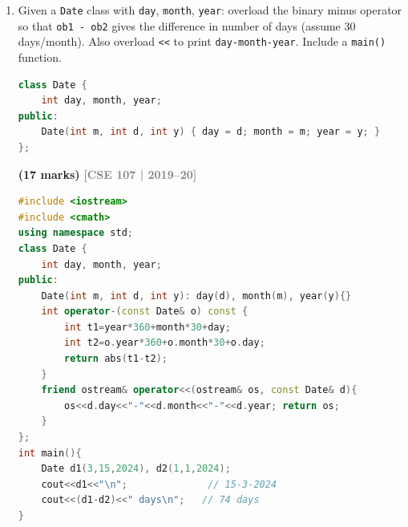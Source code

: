 \documentclass[12pt,a3paper]{article}
\newcommand{\yr}[1]{\hfill\textcolor{gray}{\small\textbf{[#1]}}}
\newcommand{\mk}[1]{\textcolor{orange!70!black}{\small\textbf{(#1 marks)}}}
\begin{document}
\begin{enumerate}
\begin{tcolorbox}
\begin{lstlisting}[language=C++]
#include <iostream>
using namespace std;

class Rational {
    int n, d;
public:
    Rational(int a=0, int b=1): n(a), d(b){}

    friend Rational operator+(const Rational& a, const Rational& b){
        return Rational(a.n*b.d + b.n*a.d, a.d*b.d);
    }
    friend Rational operator*(const Rational& a, const Rational& b){
        return Rational(a.n*b.n, a.d*b.d);
    }
    friend ostream& operator<<(ostream& os, const Rational& r){
        os<<r.n<<"/"<<r.d; return os;
    }
};

int main() {
    Rational r(1,2), s(1,3);
    cout << r+s << "\n";  // 5/6
    cout << r*s << "\n";  // 1/6
}
\end{lstlisting}

\end{tcolorbox}

\item Given a \texttt{Date} class with \texttt{day}, \texttt{month}, \texttt{year}: overload the binary minus operator so that \texttt{ob1 - ob2} gives the difference in number of days (assume 30 days/month). Also overload \texttt{<<} to print \texttt{day-month-year}. Include a \texttt{main()} function.
\begin{lstlisting}[language=C++]
class Date {
    int day, month, year;
public:
    Date(int m, int d, int y) { day = d; month = m; year = y; }
};
\end{lstlisting}
\mk{17}
\yr{CSE 107 | 2019--20}


\begin{tcolorbox}[enhanced,breakable,ansbox,colback=cF!4,colframe=cF,
  boxrule=0.8pt,arc=5pt,
  title={\textbf{Answer --- Date class --- binary - and << operators}},
  fonttitle=\bfseries\color{white},colbacktitle=cF]

\begin{lstlisting}[language=C++]
#include <iostream>
#include <cmath>
using namespace std;
class Date {
    int day, month, year;
public:
    Date(int m, int d, int y): day(d), month(m), year(y){}
    int operator-(const Date& o) const {
        int t1=year*360+month*30+day;
        int t2=o.year*360+o.month*30+o.day;
        return abs(t1-t2);
    }
    friend ostream& operator<<(ostream& os, const Date& d){
        os<<d.day<<"-"<<d.month<<"-"<<d.year; return os;
    }
};
int main(){
    Date d1(3,15,2024), d2(1,1,2024);
    cout<<d1<<"\n";              // 15-3-2024
    cout<<(d1-d2)<<" days\n";   // 74 days
}
\end{lstlisting}


\end{tcolorbox}
\end{enumerate}
\end{document}
